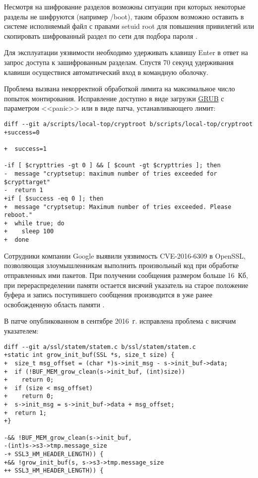 Несмотря на шифрование разделов возможны ситуации при которых некоторые разделы не шифруются (например /boot), таким образом возможно оставить в системе исполняемый файл с правами setuid root для повышения привилегий или скопировать шифрованный раздел по сети для подбора пароля \cite{cryptsetup}.

Для эксплуатации уязвимости необходимо удерживать клавишу Enter в ответ на запрос доступа к зашифрованным разделам.
Спустя 70 секунд удерживания клавиши осуществися автоматический вход в командную оболочку.

Проблема вызвана некорректной обработкой лимита на максимальное число попыток монтирования.
Исправление доступно в виде загрузки \hyperlink{grub}{GRUB} с параметром <<panic>> или в виде патча, устанавливающего лимит:
\begin{lstlisting}
diff --git a/scripts/local-top/cryptroot b/scripts/local-top/cryptroot
+success=0

+  success=1

-if [ $crypttries -gt 0 ] && [ $count -gt $crypttries ]; then
-  message "cryptsetup: maximum number of tries exceeded for $crypttarget"
-  return 1
+if [ $success -eq 0 ]; then
+  message "cryptsetup: Maximum number of tries exceeded. Please reboot."
+  while true; do
+    sleep 100
+  done
\end{lstlisting}

Сотрудники компании Google выявили уязвимость CVE-2016-6309 в OpenSSL, позволяющая злоумышленникам выполнить произвольный код при обработке отправленных ими пакетов.
При получении сообщения размером больше 16~Кб, при перераспределении памяти остается висячий указатель на старое положение буфера и запись поступившего сообщения производится в уже ранее освобожденную область памяти \cite{openssl}.

В патче опубликованном в сентябре 2016~г. исправлена проблема с висячим указателем:
\begin{lstlisting}
diff --git a/ssl/statem/statem.c b/ssl/statem/statem.c
+static int grow_init_buf(SSL *s, size_t size) {
+  size_t msg_offset = (char *)s->init_msg - s->init_buf->data;
+  if (!BUF_MEM_grow_clean(s->init_buf, (int)size))
+    return 0;
+  if (size < msg_offset)
+    return 0;
+  s->init_msg = s->init_buf->data + msg_offset;
+  return 1;
+}

-&& !BUF_MEM_grow_clean(s->init_buf,
-(int)s->s3->tmp.message_size
-+ SSL3_HM_HEADER_LENGTH)) {
+&& !grow_init_buf(s, s->s3->tmp.message_size
++ SSL3_HM_HEADER_LENGTH)) {
\end{lstlisting}

